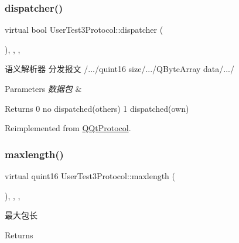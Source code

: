 \subsubsection{\texorpdfstring{dispatcher()}{dispatcher()}}
{\footnotesize\ttfamily virtual bool User\+Test3\+Protocol\+::dispatcher (\begin{DoxyParamCaption}\item[{const Q\+Byte\+Array \&}]{ }\end{DoxyParamCaption})\hspace{0.3cm}{\ttfamily [inline]}, {\ttfamily [override]}, {\ttfamily [protected]}, {\ttfamily [virtual]}}



语义解析器 分发报文 /.../quint16 size/.../\+Q\+Byte\+Array data/.../ 


\begin{DoxyParams}{Parameters}
{\em 数据包} & \\
\hline
\end{DoxyParams}
\begin{DoxyReturn}{Returns}
0 no dispatched(others) 1 dispatched(own) 
\end{DoxyReturn}


Reimplemented from \mbox{\hyperlink{class_q_qt_protocol_a35a69c4b89c8cf7459038f40d75e0dc9}{Q\+Qt\+Protocol}}.

\mbox{\label{class_user_test3_protocol_a45b85efa9aa17955df65396760930b8b}} 
\subsubsection{\texorpdfstring{maxlength()}{maxlength()}}
{\footnotesize\ttfamily virtual quint16 User\+Test3\+Protocol\+::maxlength (\begin{DoxyParamCaption}{ }\end{DoxyParamCaption})\hspace{0.3cm}{\ttfamily [inline]}, {\ttfamily [override]}, {\ttfamily [protected]}, {\ttfamily [virtual]}}



最大包长 

\begin{DoxyReturn}{Returns}

\end{DoxyReturn}


